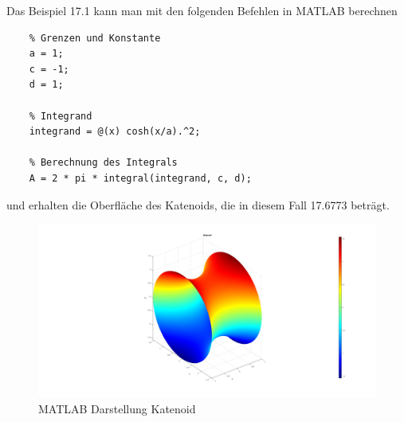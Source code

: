 Das Beispiel 17.1 kann man mit den folgenden Befehlen in MATLAB berechnen

\begin{lstlisting}
	% Grenzen und Konstante
	a = 1;
	c = -1;
	d = 1;
	
	% Integrand
	integrand = @(x) cosh(x/a).^2;
	
	% Berechnung des Integrals
	A = 2 * pi * integral(integrand, c, d);
\end{lstlisting}
%
und erhalten die Oberfläche des Katenoids, die in diesem Fall 17.6773 beträgt.


\begin{figure}
	\centering
	\includegraphics[width=0.7\linewidth]{papers/minimalflaechen/Katenoid}

	\caption{MATLAB Darstellung Katenoid}
	\label{fig:katenoid}
\end{figure}


